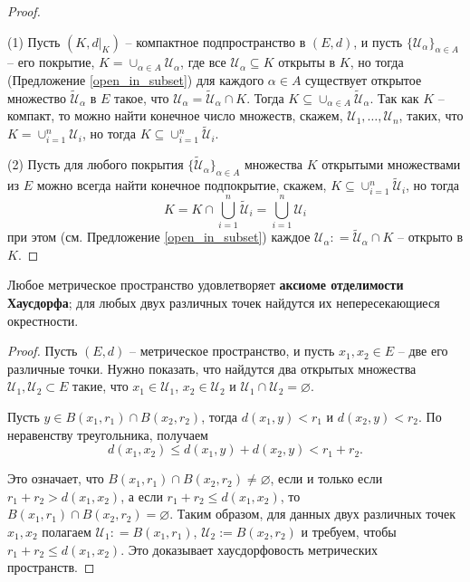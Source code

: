 \begin{proof}~

    (1) Пусть $(K,d|_K)$ -- компактное подпространство в $(E,d)$, и пусть $\{ \mathscr{U}_\alpha \}_{\alpha \in A}$ -- его покрытие, \ie $K = \cup_{\alpha \in A} \mathscr{U}_\alpha$, где все $\mathscr{U}_\alpha \subseteq K$ открыты в $K$, но тогда (Предложение \ref{open_in_subset}) для каждого $\alpha \in A$ существует открытое множество $\widetilde{\mathscr{U}}_\alpha$ в $E$ такое, что $\mathscr{U}_\alpha= \widetilde{\mathscr{U}}_\alpha \cap K$. Тогда $K \subseteq \cup_{\alpha \in A} \widetilde{\mathscr{U}}_\alpha.$ Так как $K$ -- компакт, то можно найти конечное число множеств, скажем, $\mathscr{U}_1, \ldots, \mathscr{U}_n$, таких, что $K = \cup_{i=1}^n\mathscr{U}_i$, но тогда $K \subseteq \cup_{i=1}^n \widetilde{\mathscr{U}}_i$.

(2) Пусть для любого покрытия $\{\widetilde{\mathscr{U}}_\alpha\}_{\alpha \in A}$ множества $K$ открытыми множествами из $E$ можно всегда найти конечное подпокрытие, скажем, $K \subseteq \cup_{i=1}^n \widetilde{\mathscr{U}}_i$, но тогда 
\[
 K = K \cap \bigcup_{i=1}^n \widetilde{\mathscr{U}}_i= \bigcup_{i=1}^n \mathscr{U}_i
\]
при этом (см. Предложение \ref{open_in_subset}) каждое $\mathscr{U}_\alpha : = \widetilde{\mathscr{U}}_\alpha \cap K$ -- открыто в $K$.
\end{proof}




\begin{lemma}\label{metric=hausdorff}
    Любое метрическое пространство удовлетворяет \textbf{аксиоме отделимости Хаусдорфа}; для любых двух различных точек найдутся их непересекающиеся окрестности.
\end{lemma}
\begin{proof}
    Пусть $(E,d)$ -- метрическое пространство, и пусть $x_1,x_2 \in E$ -- две его различные точки. Нужно показать, что найдутся два открытых множества $\mathscr{U}_1, \mathscr{U}_2 \subset E$ такие, что $x_1\in \mathscr{U}_1$, $x_2\in \mathscr{U}_2$ и $\mathscr{U}_1\cap \mathscr{U}_2 = \varnothing.$

   Пусть $y \in B(x_1,r_1) \cap B(x_2,r_2)$, тогда $d(x_1,y)<r_1$ и $d(x_2,y)<r_2$. По неравенству треугольника, получаем
    \[
     d(x_1,x_2) \le d(x_1,y) + d(x_2,y)< r_1 +r_2.
    \]

    Это означает, что $B(x_1,r_1) \cap B(x_2,r_2) \ne \varnothing$, если и только если $r_1+r_2 > d(x_1,x_2)$, а если $r_1+r_2 \le d(x_1,x_2)$, то $B(x_1,r_1) \cap B(x_2,r_2) = \varnothing$. Таким образом, для данных двух различных точек $x_1,x_2$ полагаем $\mathscr{U}_1: = B(x_1,r_1)$, $\mathscr{U}_2:=B(x_2,r_2)$ и требуем, чтобы $r_1+r_2 \le d(x_1,x_2)$. Это доказывает хаусдорфовость метрических пространств. 
\end{proof}

